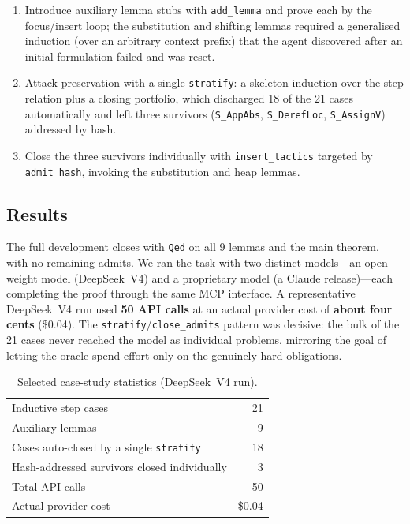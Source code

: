 \documentclass[11pt,a4paper]{article}
\begin{document}
\begin{enumerate}
\item Introduce auxiliary lemma stubs with \texttt{add\_lemma} and prove each by
  the focus/insert loop; the substitution and shifting lemmas required a
  generalised induction (over an arbitrary context prefix) that the agent
  discovered after an initial formulation failed and was reset.
\item Attack preservation with a single \texttt{stratify}: a skeleton induction
  over the step relation plus a closing portfolio, which discharged 18 of the
  21 cases automatically and left three survivors (\texttt{S\_AppAbs},
  \texttt{S\_DerefLoc}, \texttt{S\_AssignV}) addressed by hash.
\item Close the three survivors individually with \texttt{insert\_tactics}
  targeted by \texttt{admit\_hash}, invoking the substitution and heap lemmas.
\end{enumerate}

\subsection{Results}

The full development closes with \texttt{Qed} on all 9 lemmas and the main
theorem, with no remaining admits. We ran the task with two distinct
models---an open-weight model (DeepSeek~V4) and a proprietary model (a Claude
release)---each completing the proof through the same MCP interface. A
representative DeepSeek~V4 run used \textbf{50 API calls} at an actual provider
cost of \textbf{about four cents} (\$0.04). The \texttt{stratify}/\texttt{close\_admits}
pattern was decisive: the bulk of the 21 cases never reached the model as
individual problems, mirroring the goal of letting the oracle spend effort only
on the genuinely hard obligations.

\begin{table}[t]
\centering
\caption{Selected case-study statistics (DeepSeek~V4 run).}
\begin{tabular}{lr}
\hline
Inductive step cases & 21\\
Auxiliary lemmas & 9\\
Cases auto-closed by a single \texttt{stratify} & 18\\
Hash-addressed survivors closed individually & 3\\
Total API calls & 50\\
Actual provider cost & \$0.04\\
\hline
\end{tabular}
\end{table}
\end{document}
